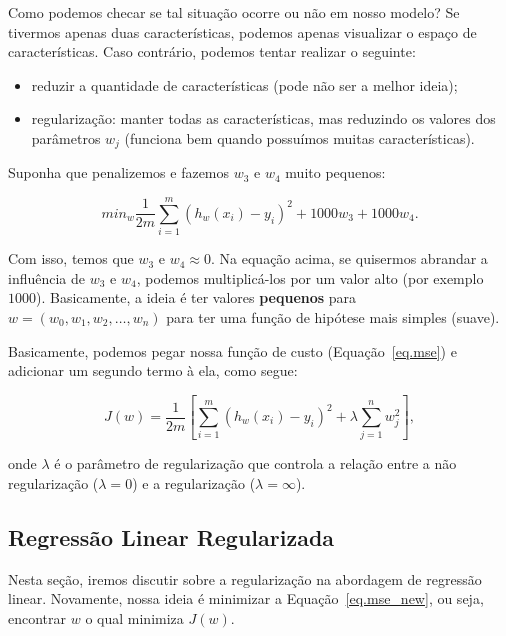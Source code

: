Como podemos checar se tal situação ocorre ou não em nosso modelo? Se tivermos apenas duas características, podemos apenas visualizar o espaço de características. Caso contrário, podemos tentar realizar o seguinte:

\begin{itemize}

\item reduzir a quantidade de características (pode não ser a melhor ideia);
\item regularização: manter todas as características, mas reduzindo os valores dos parâmetros $w_j$ (funciona bem quando possuímos muitas características).
	
\end{itemize}

Suponha que penalizemos e fazemos $w_3$ e $w_4$ muito pequenos:

\begin{equation}
\label{e.small_w}
min_w \frac{1}{2m} \sum\limits_{i=1}^m (h_w(x_i) - y_i)^2 + 1000w_3 + 1000w_4.	
\end{equation}

Com isso, temos que $w_3$ e $w_4 \approx 0$. Na equação acima, se quisermos abrandar a influência de $w_3$ e $w_4$, podemos multiplicá-los por um valor alto (por exemplo $1000$). Basicamente, a ideia é ter valores \textbf{pequenos} para $w = (w_0, w_1, w_2, \dots, w_n)$ para ter uma função de hipótese mais simples (suave).

Basicamente, podemos pegar nossa função de custo (Equação~\ref{eq.mse}) e adicionar um segundo termo à ela, como segue:

\begin{equation}
\label{eq.mse_new}
J(w) = \frac{1}{2m} [\sum\limits_{i=1}^m (h_w(x_i) - y_i)^2 + \lambda\sum\limits_{j=1}^n w_j^2],
\end{equation}

onde $\lambda$ é o parâmetro de regularização que controla a relação entre a não regularização ($\lambda = 0$) e a regularização ($\lambda = \infty$).

\subsection{Regressão Linear Regularizada}
\label{ss.linear_regression_reg}

Nesta seção, iremos discutir sobre a regularização na abordagem de regressão linear. Novamente, nossa ideia é minimizar a Equação~\ref{eq.mse_new}, ou seja, encontrar $w$ o qual minimiza $J(w)$.

